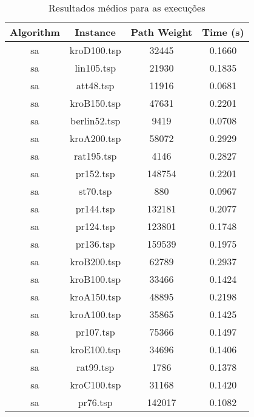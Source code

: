 \documentclass{article}
\begin{document}
\begin{center}
	\begin{table}[h!]
		\centering
		\begin{tabular}{|c|c|c|c|}
			\hline
			Algorithm & Instance     & Path Weight & Time (s) \\ \hline
			sa        & kroD100.tsp  & 32445       & 0.1660   \\ \hline
			sa        & lin105.tsp   & 21930       & 0.1835   \\ \hline
			sa        & att48.tsp    & 11916       & 0.0681   \\ \hline
			sa        & kroB150.tsp  & 47631       & 0.2201   \\ \hline
			sa        & berlin52.tsp & 9419        & 0.0708   \\ \hline
			sa        & kroA200.tsp  & 58072       & 0.2929   \\ \hline
			sa        & rat195.tsp   & 4146        & 0.2827   \\ \hline
			sa        & pr152.tsp    & 148754      & 0.2201   \\ \hline
			sa        & st70.tsp     & 880         & 0.0967   \\ \hline
			sa        & pr144.tsp    & 132181      & 0.2077   \\ \hline
			sa        & pr124.tsp    & 123801      & 0.1748   \\ \hline
			sa        & pr136.tsp    & 159539      & 0.1975   \\ \hline
			sa        & kroB200.tsp  & 62789       & 0.2937   \\ \hline
			sa        & kroB100.tsp  & 33466       & 0.1424   \\ \hline
			sa        & kroA150.tsp  & 48895       & 0.2198   \\ \hline
			sa        & kroA100.tsp  & 35865       & 0.1425   \\ \hline
			sa        & pr107.tsp    & 75366       & 0.1497   \\ \hline
			sa        & kroE100.tsp  & 34696       & 0.1406   \\ \hline
			sa        & rat99.tsp    & 1786        & 0.1378   \\ \hline
			sa        & kroC100.tsp  & 31168       & 0.1420   \\ \hline
			sa        & pr76.tsp     & 142017      & 0.1082   \\ \hline
		\end{tabular}
		\caption{Resultados médios para as execuções}
	\end{table}

\end{center}
\end{document}
